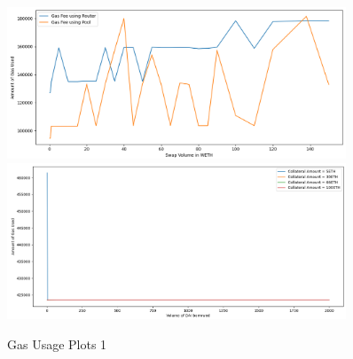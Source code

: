 \begin{figure}[!htb]
    \centering
    \includegraphics[width=0.9\textwidth]{project/Images/SwapFeesPlot.png}\\
    \includegraphics[width=0.9\textwidth]{project/Images/BorrowFees1.png}
    \caption{Gas Usage Plots 1 \label{fig:gasPlots1}}
\end{figure}

